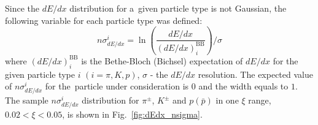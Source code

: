 \noindent Since the $dE/dx$ distribution for a~given particle type
is not Gaussian, the following variable for each particle type was defined:
\begin{equation}
n\sigma^i_{dE/dx}=\ln\left(\frac{dE/dx}{(dE/dx)_i^\textrm{{BB}}}\right)/\sigma
\label{eq:nsigma}
\end{equation}
where $(dE/dx)_i^\textrm{{BB}}$ is the Bethe-Bloch (Bichsel) expectation
of $dE/dx$ for the given particle type $i$ $(i =
\pi, K, p)$, $\sigma$ - the $dE/dx$ resolution.
The expected value of $n\sigma^i_{dE/dx}$ for the~particle under consideration is  $0$  and the width equals to $1$. The sample $n\sigma^i_{dE/dx}$ distribution for $\pi^{\pm}$, $K^\pm$ and $p(\bar{p})$ in one $\xi$ range, $0.02 < \xi < 0.05$, is shown  in Fig.~\ref{fig:dEdx_nsigma}.
\begin{figure}[h!]
	

\end{figure}
